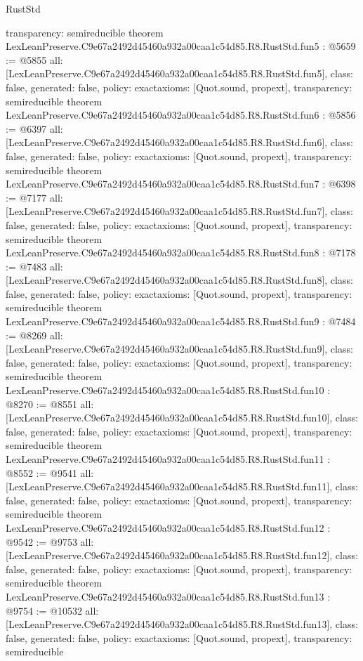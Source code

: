 \begin{lexlean}{RustStd}
\begin{coremodule}
{  transparency: semireducible
}
theorem LexLeanPreserve.C9e67a2492d45460a932a00caa1c54d85.R8.RustStd.fun5 : @5659 := @5855 {
  all: [LexLeanPreserve.C9e67a2492d45460a932a00caa1c54d85.R8.RustStd.fun5],
  class: false,
  generated: false,
  policy: exact{axioms: [Quot.sound, propext]},
  transparency: semireducible
}
theorem LexLeanPreserve.C9e67a2492d45460a932a00caa1c54d85.R8.RustStd.fun6 : @5856 := @6397 {
  all: [LexLeanPreserve.C9e67a2492d45460a932a00caa1c54d85.R8.RustStd.fun6],
  class: false,
  generated: false,
  policy: exact{axioms: [Quot.sound, propext]},
  transparency: semireducible
}
theorem LexLeanPreserve.C9e67a2492d45460a932a00caa1c54d85.R8.RustStd.fun7 : @6398 := @7177 {
  all: [LexLeanPreserve.C9e67a2492d45460a932a00caa1c54d85.R8.RustStd.fun7],
  class: false,
  generated: false,
  policy: exact{axioms: [Quot.sound, propext]},
  transparency: semireducible
}
theorem LexLeanPreserve.C9e67a2492d45460a932a00caa1c54d85.R8.RustStd.fun8 : @7178 := @7483 {
  all: [LexLeanPreserve.C9e67a2492d45460a932a00caa1c54d85.R8.RustStd.fun8],
  class: false,
  generated: false,
  policy: exact{axioms: [Quot.sound, propext]},
  transparency: semireducible
}
theorem LexLeanPreserve.C9e67a2492d45460a932a00caa1c54d85.R8.RustStd.fun9 : @7484 := @8269 {
  all: [LexLeanPreserve.C9e67a2492d45460a932a00caa1c54d85.R8.RustStd.fun9],
  class: false,
  generated: false,
  policy: exact{axioms: [Quot.sound, propext]},
  transparency: semireducible
}
theorem LexLeanPreserve.C9e67a2492d45460a932a00caa1c54d85.R8.RustStd.fun10 : @8270 := @8551 {
  all: [LexLeanPreserve.C9e67a2492d45460a932a00caa1c54d85.R8.RustStd.fun10],
  class: false,
  generated: false,
  policy: exact{axioms: [Quot.sound, propext]},
  transparency: semireducible
}
theorem LexLeanPreserve.C9e67a2492d45460a932a00caa1c54d85.R8.RustStd.fun11 : @8552 := @9541 {
  all: [LexLeanPreserve.C9e67a2492d45460a932a00caa1c54d85.R8.RustStd.fun11],
  class: false,
  generated: false,
  policy: exact{axioms: [Quot.sound, propext]},
  transparency: semireducible
}
theorem LexLeanPreserve.C9e67a2492d45460a932a00caa1c54d85.R8.RustStd.fun12 : @9542 := @9753 {
  all: [LexLeanPreserve.C9e67a2492d45460a932a00caa1c54d85.R8.RustStd.fun12],
  class: false,
  generated: false,
  policy: exact{axioms: [Quot.sound, propext]},
  transparency: semireducible
}
theorem LexLeanPreserve.C9e67a2492d45460a932a00caa1c54d85.R8.RustStd.fun13 : @9754 := @10532 {
  all: [LexLeanPreserve.C9e67a2492d45460a932a00caa1c54d85.R8.RustStd.fun13],
  class: false,
  generated: false,
  policy: exact{axioms: [Quot.sound, propext]},
  transparency: semireducible
}
\end{coremodule}
\end{lexlean}
